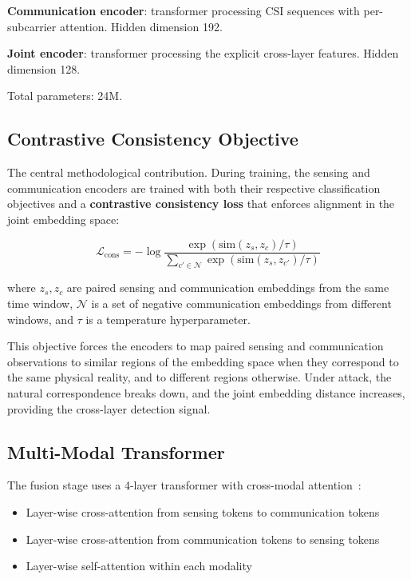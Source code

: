 \documentclass[sigconf,nonacm]{acmart}
\begin{document}
\textbf{Communication encoder}: transformer processing CSI
sequences with per-subcarrier attention. Hidden dimension 192.

\textbf{Joint encoder}: transformer processing the explicit
cross-layer features. Hidden dimension 128.

Total parameters: 24M.

\subsection{Contrastive Consistency Objective}

The central methodological contribution. During training, the
sensing and communication encoders are trained with both their
respective classification objectives and a \textbf{contrastive
consistency loss} that enforces alignment in the joint embedding
space:

\begin{equation}
  \mathcal{L}_{\text{cons}} = -\log \frac{\exp(\text{sim}(z_s, z_c)/\tau)}{\sum_{c' \in \mathcal{N}} \exp(\text{sim}(z_s, z_{c'})/\tau)}
\end{equation}

where $z_s, z_c$ are paired sensing and communication embeddings
from the same time window, $\mathcal{N}$ is a set of negative
communication embeddings from different windows, and $\tau$ is a
temperature hyperparameter.

This objective forces the encoders to map paired sensing and
communication observations to similar regions of the embedding
space when they correspond to the same physical reality, and to
different regions otherwise. Under attack, the natural
correspondence breaks down, and the joint embedding distance
increases, providing the cross-layer detection signal.

\subsection{Multi-Modal Transformer}

The fusion stage uses a 4-layer transformer with cross-modal
attention~\cite{tsai2019multimodal}:

\begin{itemize}
  \item Layer-wise cross-attention from sensing tokens to
        communication tokens
  \item Layer-wise cross-attention from communication tokens to
        sensing tokens
  \item Layer-wise self-attention within each modality
\end{itemize}
\end{document}

